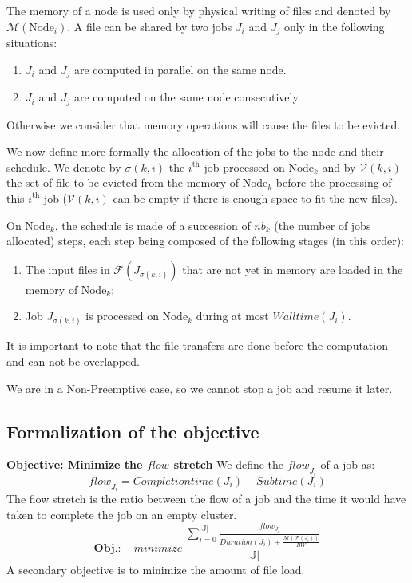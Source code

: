 \documentclass[a4paper]{article}
\newcommand{\Node}[1]{\ensuremath{\mathrm{Node}_{#1}}\xspace}
\newcommand{\flow}[1]{\ensuremath{\mathit{flow}_{#1}}\xspace}
\newcommand{\inputs}{\ensuremath{\mathcal{F}}\xspace}
\newcommand{\memory}{\ensuremath{\mathcal{M}}\xspace}
\newcommand{\duration}{\mathit{Duration}\xspace}
\newcommand{\bandwidth}{\mathit{BW}\xspace}
\newcommand{\submissiontime}{\mathit{Subtime}\xspace}
\newcommand{\walltime}{\mathit{Walltime}\xspace}
\newcommand{\completiontime}{\mathit{Completiontime}\xspace}
\newcommand{\jobset}{\ensuremath{\mathbb{J}}\xspace}
\newcommand{\evict}{\ensuremath{\mathcal{V}}\xspace}
\begin{document}
The memory of a node is used only by physical writing of files and denoted by $\memory(\Node{i})$.
A file can be shared by two jobs $J_i$ and $J_j$ only in the following situations:
\begin{enumerate}
	\item $J_i$ and $J_j$ are computed in parallel on the same node.
	\item $J_i$ and $J_j$ are computed on the same node consecutively.
\end{enumerate}
Otherwise we consider that memory operations will cause the files to be evicted.

We now define more formally the allocation of the jobs to the node and
their schedule.
We denote by $\sigma(k,i)$ the $i^\text{th}$ job
processed on $\Node{k}$ and by $\evict(k,i)$ the set of file to
be evicted from the memory of $\Node{k}$ before the processing
of this $i^\text{th}$ job ($\evict(k,i)$ can be empty if there is enough space to fit the new files).

On $\Node{k}$, the schedule is made of a
succession of $\mathit{nb}_k$ (the number of jobs allocated) steps, each step being composed of the
following stages (in this order):
\begin{enumerate}
\item The input files in $\inputs(J_{\sigma(k,i)})$ that are not yet in memory are loaded in the memory of $\Node{k}$;
\item Job $J_{\sigma(k,i)}$ is processed on $\Node{k}$ during at most $\walltime(J_i)$.
\end{enumerate}
It is important to note that the file transfers are done before the computation and can not be overlapped.

We are in a Non-Preemptive case, so we cannot stop a job and resume it later.

\subsection{Formalization of the objective}
\textbf{Objective: Minimize the \flow{} stretch}
		We define the \flow{J_i} of a job as:
		$$
			\flow{J_i} = \completiontime(J_i) - \submissiontime(J_i)
		$$
		The flow stretch is the ratio between the flow of a job and the time it would have taken to complete the job on an empty cluster.
		$$
			\textbf{Obj.}: \quad \mathit{minimize}~\frac{\sum_{i=0}^{|\jobset|}\frac{\flow{J_i}}{\duration(J_i) + \frac{\memory(\inputs(J_i))}{\bandwidth}}}{|\jobset|}
		$$
A secondary objective is to minimize the amount of file load.
\end{document}
